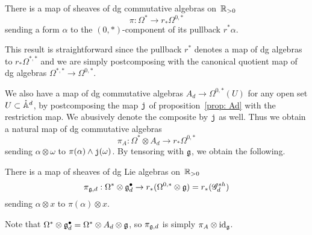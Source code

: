 \begin{lem}
There is a map of sheaves of dg commutative algebras on~$\mathbb R_{>0}$
\[
\pi: \Omega^* \to r_* \Omega^{0,*}
\]
sending a form $\alpha$ to the $(0,*)$-component of its pullback $r^*\alpha$.
\end{lem}

This result is straightforward since the pullback $r^*$ denotes a map of dg algebras to $r_* \Omega^{*,*}$ and we are simply postcomposing with the canonical quotient map of dg algebras $\Omega^{*,*} \to \Omega^{0,*}$. 

We also have a map of dg commutative algebras $A_d \to \Omega^{0,*}(U)$ for any open set $U \subset \mathring{\mathbb A}^d$,
by postcomposing the map ${\mathtt{j}}$ of proposition~\ref{prop: Ad} with the restriction map.
We abusively denote the composite by ${\mathtt{j}}$ as well.
Thus we obtain a natural map of dg commutative algebras
\[
\pi_A: \Omega^* \otimes A_d \to r_* \Omega^{0,*}
\]
sending $\alpha \otimes \omega$ to $\pi(\alpha) \wedge {\mathtt{j}}(\omega)$.
By tensoring with $\mathfrak g$, we obtain the following.

\begin{cor}
There is a map of sheaves of dg Lie algebras on~$\mathbb R_{>0}$
\[
\pi_{\mathfrak g, d}: \Omega^* \otimes \mathfrak g^\bullet_d \to r_* (\Omega^{0,*}\otimes \mathfrak g) = r_*(\mathscr G_d^{sh})
\]
sending $\alpha \otimes x$ to $\pi(\alpha) \otimes x$.
\end{cor}

Note that $\Omega^* \otimes \mathfrak g^\bullet_d = \Omega^* \otimes A_d \otimes \mathfrak g$, so $\pi_{\mathfrak g, d}$ is simply $\pi_A \otimes {\rm id}_\mathfrak g$.

